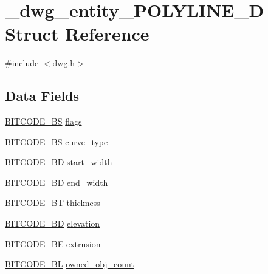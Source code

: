 \hypertarget{struct__dwg__entity__POLYLINE__2D}{\section{\-\_\-dwg\-\_\-entity\-\_\-\-P\-O\-L\-Y\-L\-I\-N\-E\-\_\-D \-Struct \-Reference}
\label{struct__dwg__entity__POLYLINE__2D}
}


{\ttfamily \#include $<$dwg.\-h$>$}

\subsection*{\-Data \-Fields}
\begin{DoxyCompactItemize}
\item 
\hyperlink{dwg_8h_a94297606fbd4a4ff97e8add284af0809}{\-B\-I\-T\-C\-O\-D\-E\-\_\-\-B\-S} \hyperlink{struct__dwg__entity__POLYLINE__2D_a9ad2a1b822d8b0e52239320b549e8acc}{flags}
\item 
\hyperlink{dwg_8h_a94297606fbd4a4ff97e8add284af0809}{\-B\-I\-T\-C\-O\-D\-E\-\_\-\-B\-S} \hyperlink{struct__dwg__entity__POLYLINE__2D_a2e3e087717efbc680a56ff152e7e8b6b}{curve\-\_\-type}
\item 
\hyperlink{dwg_8h_a3c1e6781466b74ba07785d57da70ed97}{\-B\-I\-T\-C\-O\-D\-E\-\_\-\-B\-D} \hyperlink{struct__dwg__entity__POLYLINE__2D_aa27289dba6992ed83e4eff92ad06b4e0}{start\-\_\-width}
\item 
\hyperlink{dwg_8h_a3c1e6781466b74ba07785d57da70ed97}{\-B\-I\-T\-C\-O\-D\-E\-\_\-\-B\-D} \hyperlink{struct__dwg__entity__POLYLINE__2D_aa5208da23b3907bf36d514ddb2928e78}{end\-\_\-width}
\item 
\hyperlink{dwg_8h_afc93a5ddc38aeff965d4e93c71514495}{\-B\-I\-T\-C\-O\-D\-E\-\_\-\-B\-T} \hyperlink{struct__dwg__entity__POLYLINE__2D_a6636d508625f3c678aaa232cb57ee26b}{thickness}
\item 
\hyperlink{dwg_8h_a3c1e6781466b74ba07785d57da70ed97}{\-B\-I\-T\-C\-O\-D\-E\-\_\-\-B\-D} \hyperlink{struct__dwg__entity__POLYLINE__2D_a40d34688a4bd6ee60b23eea0203efd55}{elevation}
\item 
\hyperlink{dwg_8h_ac2622137c01aa3a719ec6c571d06ee6a}{\-B\-I\-T\-C\-O\-D\-E\-\_\-\-B\-E} \hyperlink{struct__dwg__entity__POLYLINE__2D_ab6dc2c28d647d2e16b40d16ef3b622e5}{extrusion}
\item 
\hyperlink{dwg_8h_aebd5f127038868cbabc3d55d91da776c}{\-B\-I\-T\-C\-O\-D\-E\-\_\-\-B\-L} \hyperlink{struct__dwg__entity__POLYLINE__2D_a374f275d278c28fc5652b77071beb3e5}{owned\-\_\-obj\-\_\-count}

\end{DoxyCompactItemize}
